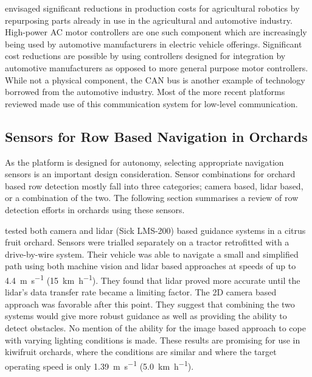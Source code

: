 \documentclass[preprint,authoryear,12pt]{elsarticle}
\begin{document}
        \cite{Blackmore2007} envisaged significant reductions in production costs for agricultural robotics by repurposing parts already in use in the agricultural and automotive industry.
        High-power AC motor controllers are one such component which are increasingly being used by automotive manufacturers in electric vehicle offerings.
        Significant cost reductions are possible by using controllers designed for integration by automotive manufacturers as opposed to more general purpose motor controllers.
        While not a physical component, the CAN bus is another example of technology borrowed from the automotive industry.
        Most of the more recent platforms reviewed made use of this communication system for low-level communication.

    \subsection{Sensors for Row Based Navigation in Orchards}

        As the platform is designed for autonomy, selecting appropriate navigation sensors is an important design consideration.
        Sensor combinations for orchard based row detection mostly fall into three categories; camera based, lidar based, or a combination of the two.
        The following section summarises a review of row detection efforts in orchards using these sensors.


        \cite{Subramanian2006} tested both camera and lidar (Sick LMS-200) based guidance systems in a citrus fruit orchard.
        Sensors were trialled separately on a tractor retrofitted with a drive-by-wire system.
        Their vehicle was able to navigate a small and simplified path using both machine vision and lidar based approaches at speeds of up to \SI{4.4}{\meter\per\second} (\SI{15}{\kilo\meter\per\hour}).
        They found that lidar proved more accurate until the lidar's data transfer rate became a limiting factor.
        The 2D camera based approach was favorable after this point.
        They suggest that combining the two systems would give more robust guidance as well as providing the ability to detect obstacles.
        No mention of the ability for the image based approach to cope with varying lighting conditions is made.
        These results are promising for use in kiwifruit orchards, where the conditions are similar and where the target operating speed is only \SI{1.39}{\meter\per\second} (\SI{5.0}{\kilo\meter\per\hour}).
\end{document}

